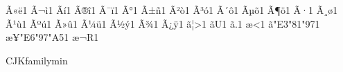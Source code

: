 \documentclass{article}
\newcommand{\HgShi}{\char"E3\char"81\char"97\relax}
\begin{document}
{        {^^c3^^ab}{{\"{e}}}1  %
        {^^c3^^ac}{{\`{i}}}1  %
        {^^c3^^ad}{{\'{i}}}1  %
        {^^c3^^ae}{{\^{i}}}1  %
        {^^c3^^af}{{\"{i}}}1  %
        {^^c3^^b0}{{\DH}}1  %
        {^^c3^^b1}{{\~{n}}}1  %
        {^^c3^^b2}{{\`{o}}}1  %
        {^^c3^^b3}{{\'{o}}}1  %
        {^^c3^^b4}{{\^{o}}}1  %
        {^^c3^^b5}{{\~{o}}}1  %
        {^^c3^^b6}{{\"{o}}}1  %
        {^^c3^^b7}{{\textdiv}}1  %
        {^^c3^^b8}{{\o}}1  %
        {^^c3^^b9}{{\`{u}}}1  %
        {^^c3^^ba}{{\'{u}}}1  %
        {^^c3^^bb}{{\^{u}}}1  %
        {^^c3^^bc}{{\"{u}}}1  %
        {^^c3^^bd}{{\'{y}}}1  %
        {^^c3^^be}{{\th}}1  %
        {^^c3^^bf}{{\"{y}}}1  %
        {^^e3^^81^^a6}{{>}}1  %
        {^^e3^^82^^8b}{{U}}1  %
        {^^e3^^80^^82}{{.}}1  %
        {^^e6^^84^^9b}{{<}}1  %
        {^^e3^^81^^97}{{\HgShi}}1  %
        {^^e6^^97^^a5}{{\char"E6\char"97\char"A5}}1  %
        {^^e6^^9c^^ac}{{R}}1  %
}
\lstset{language=$LANGUAGE}
\begin{CJK}{UTF8}{}
\newenvironment{Japanese}{CJKfamily{min}}{}
\begin{Japanese}

\end{Japanese}
\end{CJK}
\end{document}

